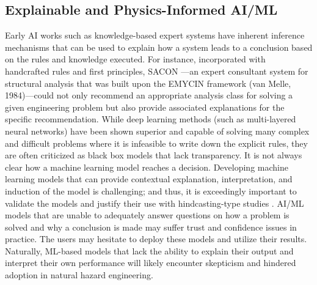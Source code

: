 \subsection{Explainable and Physics-Informed AI/ML}

Early AI works such as knowledge-based expert systems have inherent inference mechanisms that can be used to explain how a system leads to a conclusion based on the rules and knowledge executed. For instance, incorporated with handcrafted rules and first principles, SACON \citep{bennett1978sacon}—an expert consultant system for structural analysis that was built upon the EMYCIN framework (van Melle, 1984)—could not only recommend an appropriate analysis class for solving a given engineering problem but also provide associated explanations for the specific recommendation. While deep learning methods (such as multi-layered neural networks) have been shown superior and capable of solving many complex and difficult problems where it is infeasible to write down the explicit rules, they are often criticized as black box models that lack transparency. It is not always clear how a machine learning model reaches a decision. Developing machine learning models that can provide contextual explanation, interpretation, and induction of the model is challenging; and thus, it is exceedingly important to validate the models and justify their use with hindcasting-type studies \citep{darpa2016explainable, samek2019explainable, rudin2019why}. AI/ML models that are unable to adequately answer questions on how a problem is solved and why a conclusion is made may suffer trust and confidence issues in practice. The users may hesitate to deploy these models and utilize their results. Naturally, ML-based models that lack the ability to explain their output and interpret their own performance will likely encounter skepticism and hindered adoption in natural hazard engineering. 

